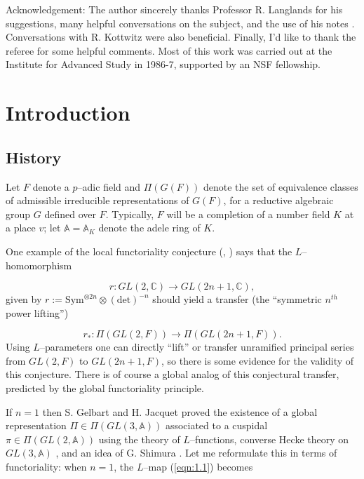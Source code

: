 \documentclass[12pt,letterpaper]{article}
\def\aaa{{\mathbb{A}}}
\def\ccc{\mathbb{C}}
\begin{document}
\noindent
Acknowledgement: The author sincerely thanks Professor R. Langlands for his
suggestions, many helpful conversations on the subject, and the use of
his notes \cite{La1}. Conversations with R. Kottwitz were also beneficial. 
Finally, I'd like to thank the referee
for some helpful comments. Most of this work was carried out at the
Institute for Advanced Study in 1986-7, supported by an NSF fellowship. 

\section{Introduction}
\label{sec:1}

\subsection{History}

Let $F$ denote a $p$--adic field and $\Pi (G(F))$ denote the set of
equivalence classes of admissible irreducible representations of $G(F)$,
for a 
reductive algebraic group $G$ defined over $F$. 
Typically, $F$ will be a completion of a
number field $K$ at a place $v$; let $\aaa = \aaa_K$ denote the adele ring 
of $K$.
 
One example of the local functoriality conjecture (\cite{Bor}, \cite{La2})
says that the 
$L$--homomorphism

\begin{equation}
\label{eqn:1.1}
r : GL(2,\ccc ) \rightarrow GL(2n+1,\ccc ),
\end{equation}
given by $r := \text{Sym}^{\otimes 2n}\otimes (\text{det})^{-n}$ should 
yield a transfer (the ``symmetric $n^{th}$ power lifting'')

\begin{equation}
\label{eqn:1.2}
r_* : \Pi (GL(2,F)) \rightarrow \Pi (GL(2n+1,F)) .
\end{equation}
Using $L$--parameters one can directly ``lift'' or transfer unramified
principal series from $GL(2,F)$ to $GL(2n+1,F)$, so there is some evidence
for the validity of this conjecture. There is of course a global analog
of this conjectural transfer, predicted by the global functoriality
principle. 
 
If $n=1$ then S. Gelbart and H. Jacquet \cite{GJ} proved the existence
of a global representation $\Pi \in \Pi (GL(3,\aaa ))$ associated
to a cuspidal $\pi \in \Pi (GL(2,\aaa ))$ using the theory of $L$--functions,
converse Hecke theory on $GL(3,\aaa )$ \cite{JPSS}, and an idea of
G. Shimura \cite{Sh}. Let me reformulate this in terms of functoriality: 
when $n = 1$, the $L$--map (\ref{eqn:1.1}) becomes
\end{document}

